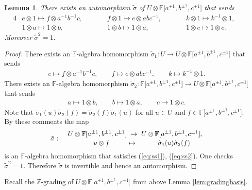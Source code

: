 \documentclass[pdftex]{sigma}
\numberwithin{equation}{section}
\newtheorem{Lemma}[Theorem]{Lemma}
\begin{document}
\begin{Lemma}
\label{lem:sigmaef}
There exists an automorphism
$\tilde \sigma $ of
$U \otimes
\mathbb F \lbrack a^{\pm 1}, b^{\pm 1}, c^{\pm 1}\rbrack $
that sends
\begin{alignat}{4}
& e \otimes 1 \mapsto f\otimes a^{-1}b^{-1}c,
\qquad  &&
f \otimes 1 \mapsto e\otimes abc^{-1},
\qquad &&
k\otimes 1 \mapsto k^{-1}\otimes 1,&
\label{eq:ss1}
\\
&
1 \otimes a \mapsto 1 \otimes b,
\qquad &&
1 \otimes b \mapsto 1 \otimes a,
\qquad &&
1 \otimes c \mapsto 1 \otimes c.&
\label{eq:ss2}
\end{alignat}
Moreover $\tilde \sigma^2=1$.
\end{Lemma}
\begin{proof}
There exists an $\mathbb F$-algebra homomorphism
$\tilde \sigma_1: U \to
U \otimes
\mathbb F \lbrack a^{\pm 1}, b^{\pm 1}, c^{\pm 1}\rbrack $
that sends
\begin{gather*}
e \mapsto f \otimes a^{-1}b^{-1}c,
\qquad
f \mapsto e \otimes abc^{-1},
\qquad
k \mapsto k^{-1} \otimes 1.
\end{gather*}
There exists an $\mathbb F$-algebra homomorphism
$\tilde \sigma_2:
\mathbb F \lbrack a^{\pm 1}, b^{\pm 1}, c^{\pm 1}\rbrack
\to
U \otimes
\mathbb F \lbrack a^{\pm 1}, b^{\pm 1}, c^{\pm 1}\rbrack $
that sends
\begin{gather*}
 a \mapsto 1 \otimes b,
\qquad
 b \mapsto 1 \otimes a,
\qquad
 c \mapsto 1 \otimes c.
\end{gather*}
Note that $\tilde \sigma_1(u)\tilde \sigma_2(f)=
\tilde \sigma_2(f) \tilde \sigma_1(u)$
for all $u \in
U$
and $f \in
\mathbb F \lbrack a^{\pm 1}, b^{\pm 1}, c^{\pm 1}\rbrack$.
By these comments
the map
\begin{gather*}
\tilde \sigma: \quad
\genfrac{}{}{0pt}{}{
U \otimes
\mathbb F \lbrack a^{\pm 1}, b^{\pm 1}, c^{\pm 1}\rbrack \; \to\;
U \otimes
\mathbb F \lbrack a^{\pm 1}, b^{\pm 1}, c^{\pm 1}\rbrack,
}
{\qquad  u \otimes f  \;\; \qquad
\mapsto
\qquad \quad
\tilde \sigma_1(u)\tilde \sigma_2(f)}
\end{gather*}
is an $\mathbb F$-algebra homomorphism
that satisf\/ies (\ref{eq:ss1}), (\ref{eq:ss2}).
One checks $\tilde \sigma^2=1$. Therefore $\tilde \sigma$ is
invertible and hence an automorphism.
\end{proof}

 Recall the $\mathbb Z$-grading
of
$U\otimes
\mathbb F \lbrack a^{\pm 1}, b^{\pm 1}, c^{\pm 1}\rbrack $ from
above Lemma
\ref{lem:gradingbasis}.
\end{document}
